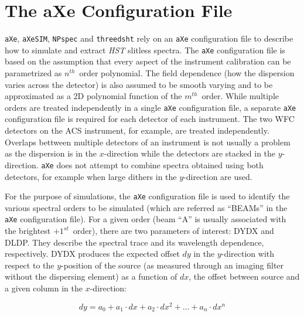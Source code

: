 \documentclass[preprint]{aastex}
\begin{document}
\section{The aXe Configuration File}\label{sec:axeconf}
\texttt{aXe}, \texttt{aXeSIM}, \texttt{NPspec} and \texttt{threedsht} rely on an \texttt{aXe} configuration file to describe how to simulate and extract \textit{HST} slitless spectra. The \texttt{aXe} configuration file is based on the assumption that every aspect of the instrument calibration can be parametrized as $n^{th}$\ order polynomial. The field dependence (how the dispersion varies across the detector) is also assumed to be smooth varying and to be approximated as a 2D polynomial function of the $m^{th}$\ order. While multiple orders are treated independently in a single \texttt{aXe} configuration file, a separate \texttt{aXe} configuration file is required for each detector of each instrument. The two WFC detectors on the ACS instrument, for example, are treated independently. Overlaps bettween multiple detectors of an instrument is not usually a problem as the dispersion is in the $x$-direction while the detectors are stacked in the $y$-direction. \texttt{aXe} does not attempt to combine spectra obtained using both detectors, for example when large dithers in the $y$-direction are used.

For the purpose of simulations, the \texttt{aXe} configuration file is used to identify the various spectral orders to be simulated (which are referred as ``BEAMs'' in the \texttt{aXe} configuration file). For a given order (beam ``A'' is usually associated with the brightest $+1^{st}$\ order), there are two parameters of interest: DYDX and DLDP. They describe the spectral trace and its wavelength dependence, respectively. DYDX produces the expected offset $dy$ in the $y$-direction with respect to the $y$-position of the source (as measured through an imaging filter without the dispersing element) as a function of $dx$, the offset between source and a given column in the $x$-direction:

\begin{dmath}
dy = a_0 + a_1 \cdot dx + a_2 \cdot dx^2 + ... + a_n \cdot dx^n \label{eq:1}
\end{dmath}
\end{document}
